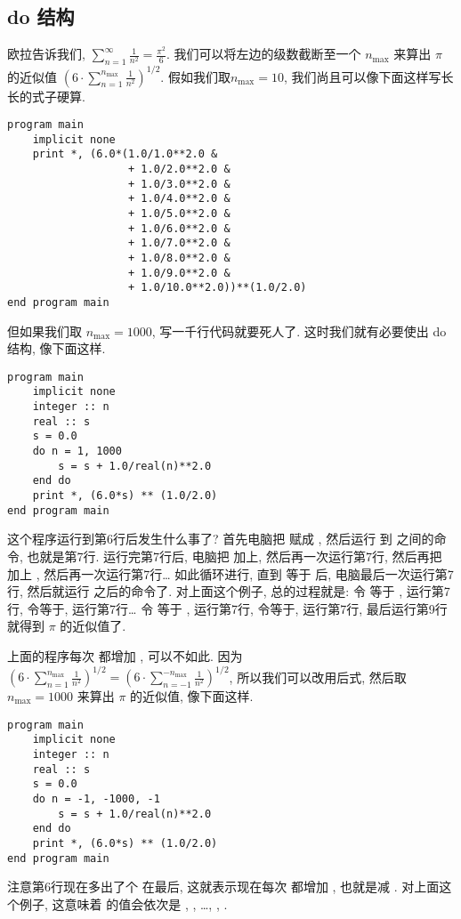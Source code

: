 \subsection{do 结构}\label{do_construct}

欧拉告诉我们, $
    \sum_{n=1}^{\infty} \frac{1}{n^2} = \frac{\pi^2}{6}$.
我们可以将左边的级数截断至一个 $n_{\text{max}}$ 来算出 $\pi$ 的近似值 $(6\cdot\sum_{n=1}^{n_{\text{max}}} \frac{1}{n^2})^{1/2}$. 假如我们取$n_{\text{max}}=10$, 我们尚且可以像下面这样写长长的式子硬算.
\begin{lstlisting}
program main
    implicit none
    print *, (6.0*(1.0/1.0**2.0 &
                   + 1.0/2.0**2.0 &
                   + 1.0/3.0**2.0 &
                   + 1.0/4.0**2.0 &
                   + 1.0/5.0**2.0 &
                   + 1.0/6.0**2.0 &
                   + 1.0/7.0**2.0 &
                   + 1.0/8.0**2.0 &
                   + 1.0/9.0**2.0 &
                   + 1.0/10.0**2.0))**(1.0/2.0)
end program main
\end{lstlisting}
但如果我们取 $n_{\text{max}}=1000$, 写一千行代码就要死人了. 这时我们就有必要使出 do 结构, 像下面这样.
\begin{lstlisting}
program main
    implicit none
    integer :: n
    real :: s
    s = 0.0
    do n = 1, 1000
        s = s + 1.0/real(n)**2.0
    end do
    print *, (6.0*s) ** (1.0/2.0)
end program main
\end{lstlisting}
这个程序运行到第6行后发生什么事了? 首先电脑把  赋成 , 然后运行  到  之间的命令, 也就是第7行. 运行完第7行后, 电脑把  加上, 然后再一次运行第7行, 然后再把  加上 , 然后再一次运行第7行\dots{} 如此循环进行, 直到  等于  后, 电脑最后一次运行第7行, 然后就运行  之后的命令了. 对上面这个例子, 总的过程就是: 令  等于 , 运行第7行, 令等于, 运行第7行\dots{} 令  等于 , 运行第7行, 令等于, 运行第7行, 最后运行第9行就得到 $\pi$ 的近似值了.

上面的程序每次  都增加 , 可以不如此. 因为 $(6\cdot\sum_{n=1}^{n_{\text{max}}} \frac{1}{n^2})^{1/2} = (6\cdot\sum_{n=-1}^{-n_{\text{max}}} \frac{1}{n^2})^{1/2}$, 所以我们可以改用后式, 然后取 $n_{\text{max}}=1000$ 来算出 $\pi$ 的近似值, 像下面这样.
\begin{lstlisting}
program main
    implicit none
    integer :: n
    real :: s
    s = 0.0
    do n = -1, -1000, -1
        s = s + 1.0/real(n)**2.0
    end do
    print *, (6.0*s) ** (1.0/2.0)
end program main
\end{lstlisting}
注意第6行现在多出了个  在最后, 这就表示现在每次  都增加 , 也就是减 . 对上面这个例子, 这意味着  的值会依次是 , , \dots{}, , .

